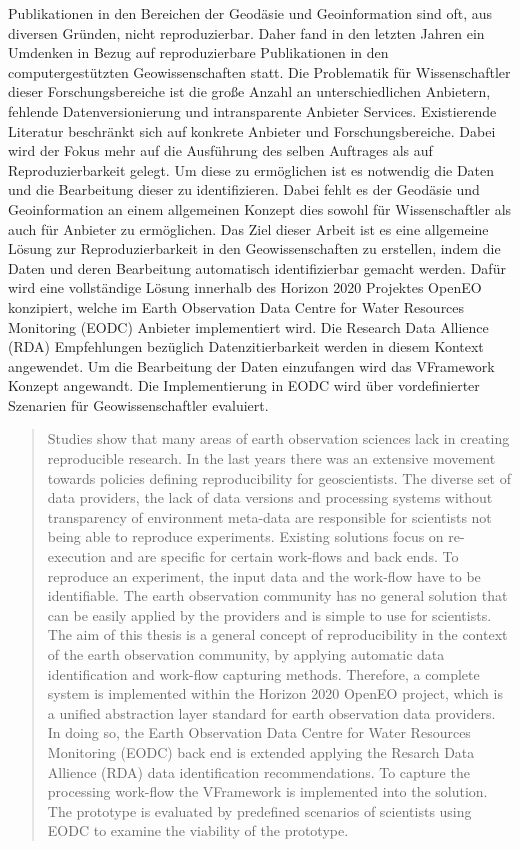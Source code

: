 \documentclass[draft,final]{vutinfth} %
\begin{document}
\begin{kurzfassung}
Publikationen in den Bereichen der Geodäsie und Geoinformation sind oft, aus diversen Gründen, nicht reproduzierbar. Daher fand in den letzten Jahren ein Umdenken in Bezug auf reproduzierbare Publikationen in den computergestützten Geowissenschaften statt. Die Problematik für Wissenschaftler dieser Forschungsbereiche ist die große Anzahl an unterschiedlichen Anbietern, fehlende Datenversionierung und intransparente Anbieter Services. Existierende Literatur beschränkt sich auf konkrete Anbieter und Forschungsbereiche. Dabei wird der Fokus mehr auf die Ausführung des selben Auftrages als auf Reproduzierbarkeit gelegt. Um diese zu ermöglichen ist es notwendig die Daten und die Bearbeitung dieser zu identifizieren. Dabei fehlt es der Geodäsie und Geoinformation an einem allgemeinen Konzept dies sowohl für Wissenschaftler als auch für Anbieter zu ermöglichen. Das Ziel dieser Arbeit ist es eine allgemeine Lösung zur Reproduzierbarkeit in den Geowissenschaften zu erstellen, indem die Daten und deren Bearbeitung automatisch identifizierbar gemacht werden. Dafür wird eine vollständige Lösung innerhalb des Horizon 2020 Projektes OpenEO konzipiert, welche im Earth Observation Data Centre for Water Resources Monitoring (EODC) Anbieter implementiert wird. Die Research Data Allience (RDA) Empfehlungen bezüglich Datenzitierbarkeit werden in diesem Kontext angewendet. Um die Bearbeitung der Daten einzufangen wird das VFramework Konzept angewandt. Die Implementierung in EODC wird über vordefinierter Szenarien für Geowissenschaftler evaluiert.    
\end{kurzfassung}


\begin{abstract}
Studies show that many areas of earth observation sciences lack in creating reproducible research. In the last years there was an extensive movement towards policies defining reproducibility for geoscientists. The diverse set of data providers, the lack of data versions and processing systems without transparency of environment meta-data are responsible for scientists not being able to reproduce experiments. Existing solutions focus on re-execution and are specific for certain work-flows and back ends. To reproduce an experiment, the input data and the work-flow have to be identifiable. The earth observation community has no general solution that can be easily applied by the providers and is simple to use for scientists. The aim of this thesis is a general concept of reproducibility in the context of the earth observation community, by applying automatic data identification and work-flow capturing methods. Therefore, a complete system is implemented within the Horizon 2020 OpenEO project, which is a unified abstraction layer standard for earth observation data providers. In doing so, the Earth Observation Data Centre for Water Resources Monitoring (EODC) back end is extended applying the Resarch Data Allience (RDA) data identification recommendations. To capture the processing work-flow the VFramework is implemented into the solution. The prototype is evaluated by predefined scenarios of scientists using EODC to examine the viability of the prototype.    
\end{abstract}
\end{document}
